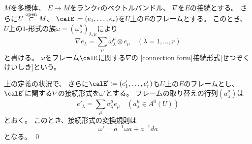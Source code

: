 \documentclass[report]{jlreq}
\begin{document}

\begin{definition}[接続形式]
    $M$を多様体、
    $E \to M$をランク$r$のベクトルバンドル、
    $\nabla$を$E$の接続とする。
    さらに$U \stackrel{\text{open}}{\subset} M$、
    $\calE \coloneqq (e_1, \dots, e_r)$を$U$上の$E$のフレームとする。
    このとき、
    $U$上の$1$-形式の族$\omega = (\omega_\lambda^\mu)_{\lambda, \mu}$により
    \begin{equation}
        \nabla e_\lambda
            = \sum_{\mu} \omega_\lambda^\mu \otimes e_\mu
            \quad (\lambda = 1, \dots, r)
    \end{equation}
    と書ける。
    $\omega$をフレーム$\calE$に関する$\nabla$の
    [connection form]{接続形式}[せつぞくけいしき]という。
\end{definition}

\begin{proposition}[接続形式の変換規則]
    上の定義の状況で、
    さらに$\calE' \coloneqq (e'_1, \dots, e'_r)$も$U$上の$E$のフレームとし、
    $\calE'$に関する$\nabla$の接続形式を$\omega'$とする。
    フレームの取り替えの行列$(a_\lambda^\mu)$は
    \begin{equation}
        e'_\lambda = \sum_{\mu} a_\lambda^\mu e_\mu
        \quad (a_\lambda^\mu \in A^0(U))
    \end{equation}
    とおく。
    このとき、接続形式の変換規則は
    \begin{equation}
        \omega' = a^{-1} \omega a + a^{-1} da
    \end{equation}
    となる。
    \qed
\end{proposition}

\begin{definition}[ベクトルバンドルの代数的構成とその接続]
    \TODO{}
\end{definition}
\end{document}
